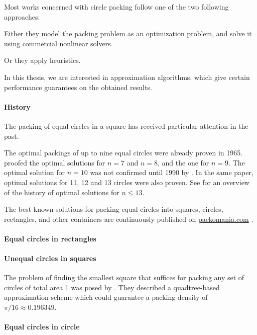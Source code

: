 Most works concerned with circle packing follow one of the two following approaches:

Either they model the packing problem as an optimization problem, and solve it using commercial nonlinear solvers.

Or they apply heuristics.

In this thesis, we are interested in approximation algorithms, which give certain performance guarantees on the obtained results.

\paragraph{History}

The packing of equal circles in a square has received particular attention in the past.

The optimal packings of up to nine equal circles were already proven in 1965.
\textcite{schaer1965densest} proofed the optimal solutions for $n = 7$ and $n = 8$, and \textcite{SM1965geometric} the one for $n = 9$.
The optimal solution for $n = 10$ was not confirmed until 1990 by \textcite{DPW1990optimal}. In the same paper, optimal solutions for 11, 12 and 13 circles were also proven.
See \textcite{WMP1994history} for an overview of the history of optimal solutions for $n \le 13$.

The best known solutions for packing equal circles into squares, circles, rectangles, and other containers are continuously published on \url{packomania.com} \cite{specht2015packomania}.

\paragraph{Equal circles in rectangles}

\paragraph{Unequal circles in squares}

The problem of finding the smallest square that suffices for packing any set of circles of total area 1 was posed by \textcite{DFL2010circle}. They described a quadtree-based approximation scheme which could guarantee a packing density of $\pi/16 \approx 0.196349$.


\paragraph{Equal circles in circle}

